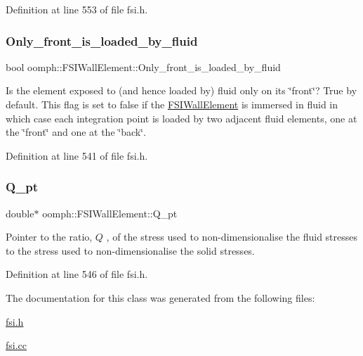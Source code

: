 Definition at line 553 of file fsi.\+h.

\mbox{\label{classoomph_1_1FSIWallElement_afaa82ab6ab3c4813c3d5342d3de91960}} 
\subsubsection{\texorpdfstring{Only\+\_\+front\+\_\+is\+\_\+loaded\+\_\+by\+\_\+fluid}{Only\_front\_is\_loaded\_by\_fluid}}
{\footnotesize\ttfamily bool oomph\+::\+F\+S\+I\+Wall\+Element\+::\+Only\+\_\+front\+\_\+is\+\_\+loaded\+\_\+by\+\_\+fluid\hspace{0.3cm}{\ttfamily [private]}}



Is the element exposed to (and hence loaded by) fluid only on its \char`\"{}front\char`\"{}? True by default. This flag is set to false if the \hyperlink{classoomph_1_1FSIWallElement}{F\+S\+I\+Wall\+Element} is immersed in fluid in which case each integration point is loaded by two adjacent fluid elements, one at the \char`\"{}front\char`\"{} and one at the \char`\"{}back\char`\"{}. 



Definition at line 541 of file fsi.\+h.

\mbox{\label{classoomph_1_1FSIWallElement_ab476ed3f14e4ffe9711d597b2703a3bc}} 
\subsubsection{\texorpdfstring{Q\+\_\+pt}{Q\_pt}}
{\footnotesize\ttfamily double$\ast$ oomph\+::\+F\+S\+I\+Wall\+Element\+::\+Q\+\_\+pt\hspace{0.3cm}{\ttfamily [private]}}



Pointer to the ratio, $ Q $ , of the stress used to non-\/dimensionalise the fluid stresses to the stress used to non-\/dimensionalise the solid stresses. 



Definition at line 546 of file fsi.\+h.



The documentation for this class was generated from the following files\+:\begin{DoxyCompactItemize}
\item 
\hyperlink{fsi_8h}{fsi.\+h}\item 
\hyperlink{fsi_8cc}{fsi.\+cc}\end{DoxyCompactItemize}
